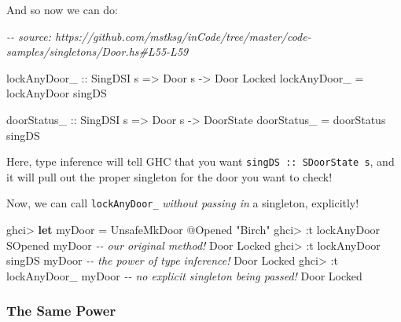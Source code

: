 \documentclass[]{article}
\newenvironment{Shaded}{}{}
\newcommand{\CommentTok}[1]{\textcolor[rgb]{0.38,0.63,0.69}{\textit{#1}}}
\newcommand{\DataTypeTok}[1]{\textcolor[rgb]{0.56,0.13,0.00}{#1}}
\newcommand{\KeywordTok}[1]{\textcolor[rgb]{0.00,0.44,0.13}{\textbf{#1}}}
\newcommand{\NormalTok}[1]{#1}
\newcommand{\OperatorTok}[1]{\textcolor[rgb]{0.40,0.40,0.40}{#1}}
\newcommand{\OtherTok}[1]{\textcolor[rgb]{0.00,0.44,0.13}{#1}}
\newcommand{\StringTok}[1]{\textcolor[rgb]{0.25,0.44,0.63}{#1}}
\begin{document}
And so now we can do:

\begin{Shaded}
\begin{Highlighting}[]
\CommentTok{{-}{-} source: https://github.com/mstksg/inCode/tree/master/code{-}samples/singletons/Door.hs\#L55{-}L59}

\OtherTok{lockAnyDoor\_ ::} \DataTypeTok{SingDSI}\NormalTok{ s }\OtherTok{=\textgreater{}} \DataTypeTok{Door}\NormalTok{ s }\OtherTok{{-}\textgreater{}} \DataTypeTok{Door} \DataTypeTok{\textquotesingle{}Locked}
\NormalTok{lockAnyDoor\_ }\OtherTok{=}\NormalTok{ lockAnyDoor singDS}

\OtherTok{doorStatus\_ ::} \DataTypeTok{SingDSI}\NormalTok{ s }\OtherTok{=\textgreater{}} \DataTypeTok{Door}\NormalTok{ s }\OtherTok{{-}\textgreater{}} \DataTypeTok{DoorState}
\NormalTok{doorStatus\_ }\OtherTok{=}\NormalTok{ doorStatus singDS}
\end{Highlighting}
\end{Shaded}

Here, type inference will tell GHC that you want
\texttt{singDS\ ::\ SDoorState\ s}, and it will pull out the proper singleton
for the door you want to check!

Now, we can call \texttt{lockAnyDoor\_} \emph{without passing in} a singleton,
explicitly!

\begin{Shaded}
\begin{Highlighting}[]
\NormalTok{ghci}\OperatorTok{\textgreater{}} \KeywordTok{let}\NormalTok{ myDoor }\OtherTok{=} \DataTypeTok{UnsafeMkDoor} \OperatorTok{@}\DataTypeTok{\textquotesingle{}Opened} \StringTok{"Birch"}
\NormalTok{ghci}\OperatorTok{\textgreater{}} \OperatorTok{:}\NormalTok{t lockAnyDoor }\DataTypeTok{SOpened}\NormalTok{ myDoor }\CommentTok{{-}{-} our original method!}
\DataTypeTok{Door} \DataTypeTok{\textquotesingle{}Locked}
\NormalTok{ghci}\OperatorTok{\textgreater{}} \OperatorTok{:}\NormalTok{t lockAnyDoor singDS myDoor  }\CommentTok{{-}{-} the power of type inference!}
\DataTypeTok{Door} \DataTypeTok{\textquotesingle{}Locked}
\NormalTok{ghci}\OperatorTok{\textgreater{}} \OperatorTok{:}\NormalTok{t lockAnyDoor\_ myDoor        }\CommentTok{{-}{-} no explicit singleton being passed!}
\DataTypeTok{Door} \DataTypeTok{\textquotesingle{}Locked}
\end{Highlighting}
\end{Shaded}

\subsubsection{The Same Power}\label{the-same-power}
\end{document}
